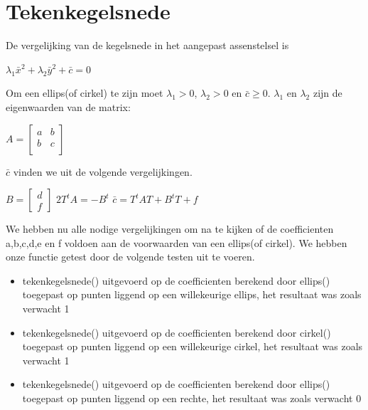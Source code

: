 \documentclass[]{article}
\begin{document}
 \pagebreak
 \section*{Tekenkegelsnede}
 
 De vergelijking van de kegelsnede in het aangepast assenstelsel is 
\begin{center}
 $\lambda_1 \bar{x}^2 + \lambda_2 \bar{y}^2 + \bar{c} = 0$
\end{center} 
Om een ellips(of cirkel) te zijn moet $\lambda_1 > 0$, $\lambda_2 > 0$ en $\bar{c} \ge 0$. $\lambda_1$ en $\lambda_2$ zijn de eigenwaarden van de matrix:

\begin{center}
$		A
		=
     \begin{bmatrix}
      a & b \\
      b & c\\
      \end{bmatrix}
      $
      \end{center}
      
\noindent $\bar{c}$ vinden we uit de volgende vergelijkingen.


\begin{center}
      $		B
		=
     \begin{bmatrix}
      d \\
      f
      \end{bmatrix}
      $
      \quad \quad \quad
      $2T^tA = -B^t$
      \quad \quad \quad
      $\bar{c} = T^tAT + B^tT +f$
      \end{center}

\noindent We hebben nu alle nodige vergelijkingen om na te kijken of de coefficienten a,b,c,d,e en f voldoen aan de voorwaarden van een ellips(of cirkel). We hebben onze functie getest door de volgende testen uit te voeren.


\begin{itemize}
  \item tekenkegelsnede() uitgevoerd op de coefficienten berekend door ellips() toegepast op punten liggend op een willekeurige ellips, het resultaat was zoals verwacht 1
  \item tekenkegelsnede() uitgevoerd op de coefficienten berekend door cirkel() toegepast op punten liggend op een willekeurige cirkel, het resultaat was zoals verwacht 1
  \item tekenkegelsnede() uitgevoerd op de coefficienten berekend door ellips() toegepast op punten liggend op een rechte, het resultaat was zoals verwacht 0
\end{itemize}
\end{document}
